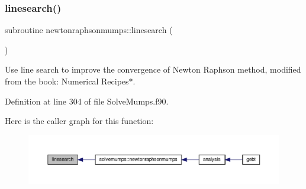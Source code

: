 \subsubsection{\texorpdfstring{linesearch()}{linesearch()}}
{\footnotesize\ttfamily subroutine newtonraphsonmumps\+::linesearch (\begin{DoxyParamCaption}{ }\end{DoxyParamCaption})\hspace{0.3cm}{\ttfamily [private]}}



Use line search to improve the convergence of Newton Raphson method, modified from the book\+: Numerical Recipes$\ast$. 



Definition at line 304 of file Solve\+Mumps.\+f90.

Here is the caller graph for this function\+:\nopagebreak
\begin{figure}[H]
\begin{center}
\leavevmode
\includegraphics[width=350pt]{_solve_mumps_8f90_abd8e42559d02f73ced63544359b8b6a9_icgraph}
\end{center}
\end{figure}
